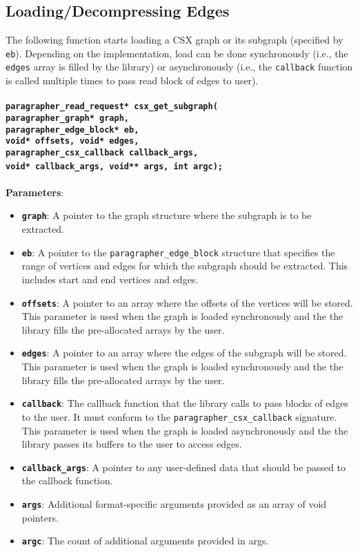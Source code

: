 \documentclass[a4paper]{article}
\begin{document}
\subsection{Loading/Decompressing Edges}
The following function starts loading a CSX graph or its subgraph (specified by \verb|eb|).
Depending on the implementation, load can be done 
synchronously (i.e., the \verb|edges| array is filled by the library) or 
asynchronously (i.e., the \verb|callback| function is called multiple times to pass read block of edges to user).
\\
\\
\textbf{\texttt{paragrapher\_read\_request* csx\_get\_subgraph(
\\{\indent}paragrapher\_graph* graph,
\\{\indent}paragrapher\_edge\_block* eb,
\\{\indent}void* offsets, void* edges,
\\{\indent}paragrapher\_csx\_callback callback\_args,
\\{\indent}void* callback\_args, void** args, int argc);}}
~\\
\\
\textbf{Parameters}:
\begin{itemize}
    \setlength{\itemsep}{0pt}
    \setlength{\parskip}{0pt}
    \setlength{\parsep}{0pt}

    \item \textbf{\texttt{graph}}: A pointer to the graph structure where the subgraph is to be extracted.
    \item \textbf{\texttt{eb}}: A pointer to the \texttt{paragrapher\_edge\_block} structure that specifies the range of vertices and edges for which the subgraph should be extracted. This includes start and end vertices and edges. 
    \item \textbf{\texttt{offsets}}: A pointer to an array where the offsets of the vertices will be stored.
    This parameter is used when the graph is loaded synchronously and the the library fills the pre-allocated arrays
    by the user.
    \item \textbf{\texttt{edges}}: A pointer to an array where the edges of the subgraph will be stored.
    This parameter is used when the graph is loaded synchronously and the the library fills the pre-allocated arrays
    by the user.
    \item \textbf{\texttt{callback}}: The callback function that the library calls to pass blocks of 
    edges to the user. It must conform to the \texttt{paragrapher\_csx\_callback} signature. 
    This parameter is used when the graph is loaded asynchronously and the the library passes its 
    buffers to the user to access edges. 
    \item \textbf{\texttt{callback\_args}}: A pointer to any user-defined data that should be passed to the callback function.
    \item \textbf{\texttt{args}}: Additional format-specific arguments provided as an array of void pointers.
    \item \textbf{\texttt{argc}}: The count of additional arguments provided in args.
\end{itemize}
\end{document}
